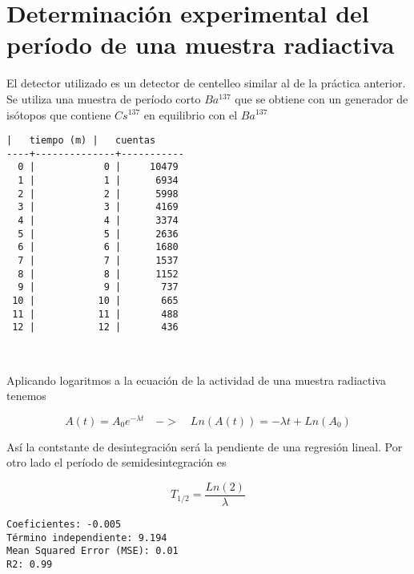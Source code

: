 \documentclass[11pt]{article}
\begin{document}
    \hypertarget{determinaciuxf3n-experimental-del-peruxedodo-de-una-muestra-radiactiva}{%
\section{Determinación experimental del período de una muestra
radiactiva}\label{determinaciuxf3n-experimental-del-peruxedodo-de-una-muestra-radiactiva}}

El detector utilizado es un detector de centelleo similar al de la
práctica anterior. Se utiliza una muestra de período corto \(Ba^{137}\)
que se obtiene con un generador de isótopos que contiene \(Cs^{137}\) en
equilibrio con el \(Ba^{137}\)

    \begin{Verbatim}[commandchars=\\\{\}]
    |   tiempo (m) |   cuentas
----+--------------+-----------
  0 |            0 |     10479
  1 |            1 |      6934
  2 |            2 |      5998
  3 |            3 |      4169
  4 |            4 |      3374
  5 |            5 |      2636
  6 |            6 |      1680
  7 |            7 |      1537
  8 |            8 |      1152
  9 |            9 |       737
 10 |           10 |       665
 11 |           11 |       488
 12 |           12 |       436
    \end{Verbatim}

    \begin{center}
    \end{center}
    { \hspace*{\fill} \\}
    
    Aplicando logaritmos a la ecuación de la actividad de una muestra
radiactiva tenemos

\[
A(t) = A_0e^{-\lambda t} \quad -> \quad Ln (A(t)) = -\lambda t +Ln(A_0)
\]

Así la contstante de desintegración será la pendiente de una regresión
lineal. Por otro lado el período de semidesintegración es

\[
T_{1/2} = \frac{Ln(2)}{\lambda}
\]

    \begin{Verbatim}[commandchars=\\\{\}]
Coeficientes: -0.005
Término independiente: 9.194
Mean Squared Error (MSE): 0.01
R2: 0.99
    \end{Verbatim}

    \begin{center}
    \end{center}
    { \hspace*{\fill} \\}
     
\end{document}
